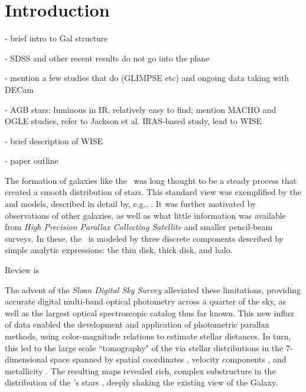 \section{Introduction}


- brief intro to Gal structure

- SDSS and other recent results do not go into the plane

- mention a few studies that do (GLIMPSE etc) and ongoing data taking with DECam

- AGB stars: luminous in IR, relatively easy to find; mention MACHO and OGLE studies, 
   refer to Jackson et al. IRAS-based study, lead to WISE

- brief description of WISE

- paper outline




The formation of galaxies like the \mw\, was long thought to be a steady process that created a smooth distribution of stars. This standard view was exemplified by the \cite{1980ApJS...44...73B} and \cite{1989ARA&A..27..555G} models, described in detail by, e.g., \cite{1993ARA&A..31..575M}. It was further motivated by observations of other galaxies, as well as what little information was available from \emph{High Precision Parallax Collecting Satellite} \citep[\emph{HIPPARCOS}, ][]{1984SSRv...39....1K} and smaller pencil-beam surveys. In these, the \mw\, is modeled by three discrete components described by simple analytic expressions: the thin disk, thick disk, and halo. 

Review is \citet{IBJ2012} \citep{IBJ2012}


The advent of the \emph{Sloan Digital Sky Survey} \citep[\sdss, ][]{2000AJ....120.1579Y} alleviated these limitations, providing accurate digital multi-band optical photometry across a quarter of the sky, as well as the largest optical spectroscopic catalog thus far known. This new influx of data enabled the development and application of photometric parallax methods, using color-magnitude relations to estimate stellar distances. In turn, this led to the large scale ``tomography" of the \mw\; via stellar distributions in the 7-dimensional space spanned by spatial coordinates \citep{2008ApJ...673..864J}, velocity components \citep{2010ApJ...716....1B}, and metallicity \citep{2008ApJ...684..287I}. The resulting maps revealed rich, complex substructure in the distribution of the \mw's stars \citep[e.g.][]{2000AJ....120..963I,2000ApJ...540..825Y,2001ApJ...554L..33V,2002ApJ...569..245N,2003ApJ...599.1082M,2006ApJ...642L.137B,2006ApJ...651L..29G,2006AJ....132..714V}, deeply shaking the existing view of the Galaxy. 




